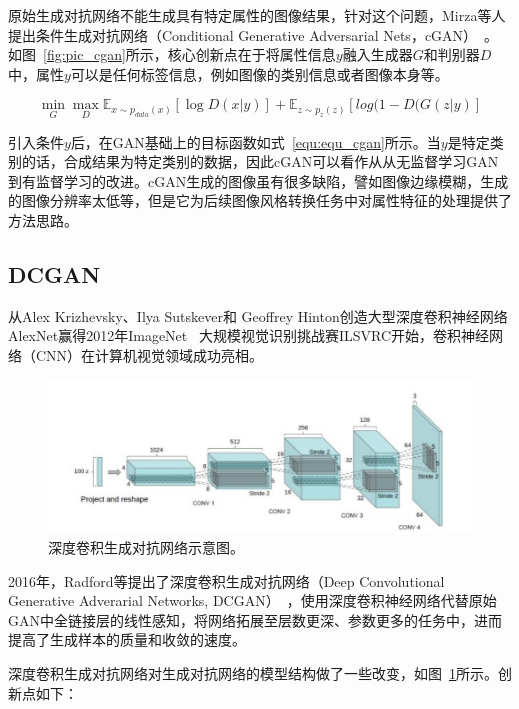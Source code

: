 原始生成对抗网络不能生成具有特定属性的图像结果，针对这个问题，Mirza等人提出条件生成对抗网络（Conditional Generative Adversarial Nets，cGAN）~\citep{mirza2014conditional}。如图~\ref{fig:pic_cgan}所示，核心创新点在于将属性信息$y$融入生成器$G$和判别器$D$中，属性$y$可以是任何标签信息，例如图像的类别信息或者图像本身等。

\begin{equation}
\label{equ:equ_cgan}
\mathop{min} \limits_{G} \mathop{max} \limits_{D} \mathbb{E}_{x \sim p_{data}(x)}[\log D(x|y)] + \mathbb{E}_{z \sim p_{z}(z)}[log(1-D(G(z|y)]
\end{equation}

引入条件$y$后，在GAN基础上的目标函数如式~\ref{equ:equ_cgan}所示。当$y$是特定类别的话，合成结果为特定类别的数据，因此cGAN可以看作从从无监督学习GAN到有监督学习的改进。cGAN生成的图像虽有很多缺陷，譬如图像边缘模糊，生成的图像分辨率太低等，但是它为后续图像风格转换任务中对属性特征的处理提供了方法思路。


\subsection{DCGAN}
从Alex Krizhevsky、Ilya Sutskever和 Geoffrey Hinton创造大型深度卷积神经网络AlexNet\cite{krizhevsky2017imagenet}赢得2012年ImageNet~\cite{deng2009imagenet} 大规模视觉识别挑战赛ILSVRC开始，卷积神经网络（CNN）在计算机视觉领域成功亮相。

\begin{figure}[ht]
    \centering
	\includegraphics[width=\textwidth]{figs/dcgan.pdf}
	\caption{深度卷积生成对抗网络示意图。}
	\label{fig:pic_dcgan}
\end{figure}

2016年，Radford等提出了深度卷积生成对抗网络（Deep Convolutional Generative Adverarial Networks, DCGAN）~\cite{radford2015unsupervised}，使用深度卷积神经网络代替原始GAN中全链接层的线性感知，将网络拓展至层数更深、参数更多的任务中，进而提高了生成样本的质量和收敛的速度。

深度卷积生成对抗网络对生成对抗网络的模型结构做了一些改变，如图~\ref{fig:pic_dcgan}所示。创新点如下：

